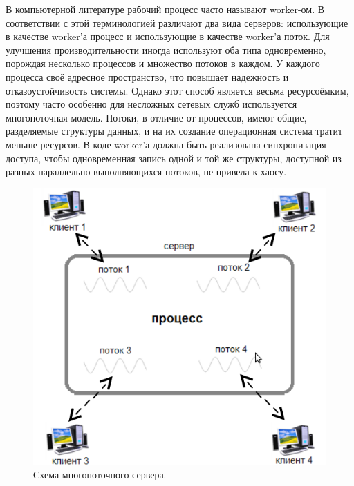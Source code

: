 \documentclass[12pt, a4paper, oneside]{article}
\begin{document}
В компьютерной литературе рабочий процесс часто называют worker-ом. В соответствии с этой терминологией различают два вида серверов: использующие в качестве worker’а процесс и использующие в качестве worker’а поток. Для улучшения производительности иногда используют оба типа одновременно, порождая несколько процессов и множество потоков в каждом. У каждого процесса своё адресное пространство, что повышает надежность и отказоустойчивость системы. Однако этот способ является весьма ресурсоёмким, поэтому часто особенно для несложных сетевых служб используется многопоточная модель. Потоки, в отличие от процессов, имеют общие, разделяемые структуры данных, и на их создание операционная система тратит меньше ресурсов. В коде worker'а должна быть реализована синхронизация доступа, чтобы одновременная запись одной и той же структуры, доступной из разных параллельно выполняющихся потоков, не привела к хаосу.
\begin{figure}[t!]
\begin{center}
	\includegraphics[scale=0.5]{threads.png}
	\caption{Схема многопоточного сервера.}
	\label{fig:threads}
        \vspace{-0.5cm}
\end{center}
\end{figure}
\end{document}
